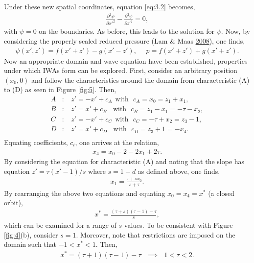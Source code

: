 \documentclass[a4paper]{article}
\numberwithin{equation}{section}
\begin{document}
Under these new spatial coordinates, equation \eqref{eq:3.2} becomes, 
\begin{align}\label{eq:3.5}
\frac{\partial^2\psi}{\partial x'^2} - \frac{\partial^2\psi}{\partial z'^2} = 0,
\end{align}
with $\psi = 0$ on the boundaries. As before, this leads to the solution for $\psi$. Now, by considering the properly scaled reduced pressure (Lam \& Maas \hyperlink{ref 18}{2008}), one finds, 
\begin{align}\label{eq:3.6}
\psi(x', z') = f(x' + z') - g(x' - z'), ~~~~~~p = f(x'+z') + g(x'+z').
\end{align}
Now an appropriate domain and wave equation have been established, properties under which IWAs form can be explored. First, consider an arbitrary position $(x_0, 0)$ and follow the characteristics around the domain from characteristic (A) to (D) as seen in Figure \ref{fig:5}. Then,
\begin{equation*}
\begin{split}
A&: ~~~~ z' = -x' + c_A ~~ \text{with}  ~~~ c_A = x_0 = z_1 + x_1,\\
B&: ~~~~ z' = x' + c_B ~~~~ \text{with}  ~~~ c_B = z_1 - x_1 = -\tau - x_2,\\C&: ~~~~ z' = -x' + c_C ~~ \text{with}  ~~~ c_C = -\tau + x_2 = z_3 - 1,\\
D&: ~~~~ z' = x' + c_D ~~~~ \text{with}  ~~~ c_D = z_3 + 1 = -x_4.\\
\end{split}
\end{equation*}
Equating coefficients, $c_i$, one arrives at the relation, 
\begin{align*}
x_ 4 = x_0 - 2 - 2x_1 + 2\tau.
\end{align*}
By considering the equation for characteristic (A) and noting that the slope has equation $z' = \tau(x'-1)/s$ where $s = 1 -d$ as defined above, one finds,
\begin{align*}
x_1 = \frac{\tau + sx_0}{s + \tau}.
\end{align*}
By rearranging the above two equations and equating $x_0 = x_4 = x^*$ (a closed orbit), 
\begin{align*}
x^* = \frac{(\tau + s)(\tau -1) - \tau}{s},
\end{align*}
which can be examined for a range of $s$ values. To be consistent with Figure \ref{fig:4}(b), consider $s = 1$. Moreover, note that restrictions are imposed on the domain such that $-1 < x^* < 1$. Then,
\begin{align}\label{eq:3.7}
x^* = (\tau + 1)(\tau -1) - \tau ~~~ \implies ~~~ 1 < \tau < 2.
\end{align}
\end{document}

